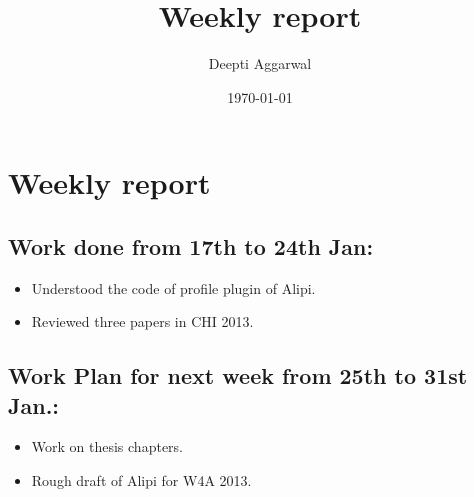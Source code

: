 \documentclass[11pt]{article}
\title{Weekly report}
\author{Deepti Aggarwal}
\date{\today}
\begin{document}
\maketitle

\setcounter{tocdepth}{3}
\vspace*{1cm}
\section{Weekly report}
\label{sec-1}


\subsection{Work done from 17th to 24th Jan:}
\label{sec-1-1}
\begin{itemize}
\item Understood the code of profile plugin of Alipi. 
\item Reviewed three papers in CHI 2013. 
\end{itemize}


\subsection{Work Plan for next week from 25th to 31st Jan.:}
\label{sec-1-2}
\begin{itemize}
\item Work on thesis chapters.
\item Rough draft of Alipi for W4A 2013. 
\end{itemize}
\end{document}
